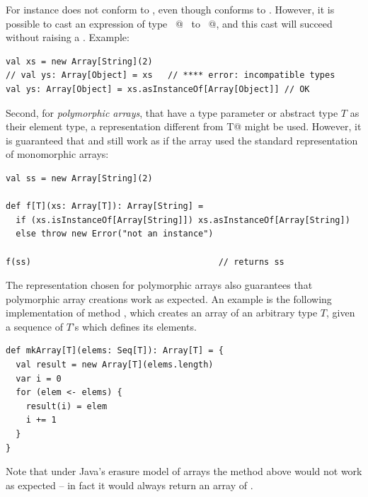 For instance  does not conform to
, even though  conforms to .
However, it is possible to cast an expression of type
~\lstinline@Array[String]@~ to ~\lstinline@Array[Object]@, and this
cast will succeed without raising a . Example:
\begin{lstlisting}
val xs = new Array[String](2)
// val ys: Array[Object] = xs   // **** error: incompatible types
val ys: Array[Object] = xs.asInstanceOf[Array[Object]] // OK
\end{lstlisting}

Second, for {\em polymorphic arrays}, that have a type parameter or
abstract type $T$ as their element type, a representation different
from
\lstinline@[]T@ might be used. However, it is guaranteed that 
 and  still work as if the array 
used the standard representation of monomorphic arrays:
\begin{lstlisting}
val ss = new Array[String](2)

def f[T](xs: Array[T]): Array[String] = 
  if (xs.isInstanceOf[Array[String]]) xs.asInstanceOf[Array[String])
  else throw new Error("not an instance")

f(ss)                                     // returns ss
\end{lstlisting}
The representation chosen for polymorphic arrays also guarantees that
polymorphic array creations work as expected. An example is the
following implementation of method \lstinline@mkArray@, which creates
an array of an arbitrary type $T$, given a sequence of $T$'s which
defines its elements.
\begin{lstlisting}
def mkArray[T](elems: Seq[T]): Array[T] = {
  val result = new Array[T](elems.length)
  var i = 0
  for (elem <- elems) {
    result(i) = elem
    i += 1
  }
}
\end{lstlisting}
Note that under Java's erasure model of arrays the method above would
not work as expected -- in fact it would always return an array of
\lstinline@Object@.

